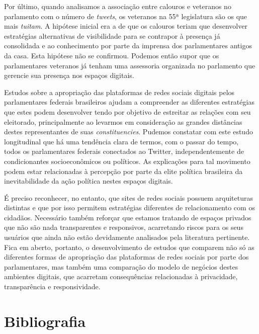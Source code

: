Por último, quando analisamos a associação entre calouros e veteranos no
parlamento com o número de \emph{tweets}, os veteranos na 55ª
legislatura são os que mais \emph{tuitam}. A hipótese inicial era a de
que os calouros teriam que desenvolver estratégias alternativas de
visibilidade para se contrapor à presença já consolidada e ao
conhecimento por parte da imprensa dos parlamentares antigos da casa.
Esta hipótese não se confirmou. Podemos então supor que os parlamentares
veteranos já tenham uma assessoria organizada no parlamento que gerencie
sua presença nos espaços digitais.

Estudos sobre a apropriação das plataformas de redes sociais digitais
pelos parlamentares federais brasileiros ajudam a compreender as
diferentes estratégias que estes podem desenvolver tendo por objetivo de
estreitar as relações com seu eleitorado, principalmente ao levarmos em
consideração as grandes distâncias destes representantes de suas
\emph{constituencies}. Pudemos constatar com este estudo longitudinal
que há uma tendência clara de termos, com o passar do tempo, todos os
parlamentares federais conectados ao Twitter, independentemente de
condicionantes socioeconômicos ou políticos. As explicações para tal
movimento podem estar relacionadas à percepção por parte da elite
política brasileira da inevitabilidade da ação política nestes espaços
digitais.

É preciso reconhecer, no entanto, que sites de redes sociais possuem
arquiteturas distintas e que por isso permitem estratégias diferentes de
relacionamento com os cidadãos. Necessário também reforçar que estamos
tratando de espaços privados que não são nada transparentes e
responsivos, acarretando riscos para os seus usuários que ainda não
estão devidamente analisados pela literatura pertinente. Fica em aberto,
portanto, o desenvolvimento de estudos que comparem não só as diferentes
formas de apropriação das plataformas de redes sociais por parte dos
parlamentares, mas também uma comparação do modelo de negócios destes
ambientes digitais, que acarretam consequências relacionadas à
privacidade, transparência e responsividade.

\section{Bibliografia}


